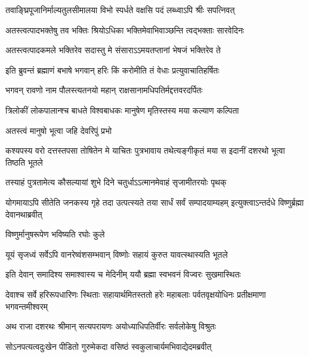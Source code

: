 \twolineshloka
{तवाङ्घ्रिपूजानिर्माल्यतुलसीमालया विभो}
{स्पर्धते वक्षसि पदं लब्ध्वाऽपि श्रीः सपत्निवत्} %

\twolineshloka
{अतस्त्वत्पादभक्तेषु तव भक्तिः श्रियोऽधिका}
{भक्तिमेवाभिवाञ्छन्ति त्वद्भक्ताः सारवेदिनः} %

\twolineshloka
{अतस्त्वत्पादकमले भक्तिरेव सदास्तु मे}
{संसाराऽऽमयतप्तानां भेषजं भक्तिरेव ते} %

\twolineshloka
{इति ब्रुवन्तं ब्रह्माणं बभाषे भगवान् हरिः}
{किं करोमीति तं वेधाः प्रत्युवाचातिहर्षितः} %

\twolineshloka
{भगवन् रावणो नाम पौलस्त्यतनयो महान्}
{राक्षसानामधिपतिर्मद्दत्तवरदर्पितः} %

\twolineshloka
{त्रिलोकीं लोकपालान्श्च बाधते विश्वबाधकः}
{मानुषेण मृतिस्तस्य मया कल्याण कल्पिता} %

\onelineshloka
{अतस्त्वं मानुषो भूत्वा जहि देवरिपुं प्रभो} %



\threelineshloka
{कश्यपस्य वरो दत्तस्तपसा तोषितेन मे}
{याचितः पुत्रभावाय तथेत्यङ्गीकृतं मया}
{स इदानीं दशरथो भूत्वा तिष्ठति भूतले} %

\twolineshloka
{तस्याहं पुत्रतामेत्य कौसल्यायां शुभे दिने}
{चतुर्धाऽऽत्मानमेवाहं सृजामीतरयोः पृथक्} %

\threelineshloka
{योगमायाऽपि सीतेति जनकस्य गृहे तदा}
{उत्पत्स्यते तया सार्धं सर्वं सम्पादयाम्यहम्}
{इत्युक्त्वाऽन्तर्दधे विष्णुर्ब्रह्मा देवानथाब्रवीत्} %


\onelineshloka
{विष्णुर्मानुषरूपेण भविष्यति रघोः कुले} %

\twolineshloka
{यूयं सृजध्वं सर्वेऽपि वानरेष्वंशसम्भवान्}
{विष्णोः सहायं कुरुत यावत्स्थास्यति भूतले} %

\twolineshloka
{इति देवान् समादिश्य समाश्वास्य च मेदिनीम्}
{ययौ ब्रह्मा स्वभवनं विज्वरः सुखमास्थितः} %

\fourlineindentedshloka
{देवाश्च सर्वे हरिरूपधारिणः}
{स्थिताः सहायार्थमितस्ततो हरेः}
{महाबलाः पर्वतवृक्षयोधिनः}
{प्रतीक्षमाणा भगवन्तमीश्वरम्} %




\twolineshloka
{अथ राजा दशरथः श्रीमान् सत्यपरायणः}
{अयोध्याधिपतिर्वीरः सर्वलोकेषु विश्रुतः} %

\twolineshloka
{सोऽनपत्यत्वदुःखेन पीडितो गुरुमेकदा}
{वसिष्ठं स्वकुलाचार्यमभिवाद्येदमब्रवीत्} %

